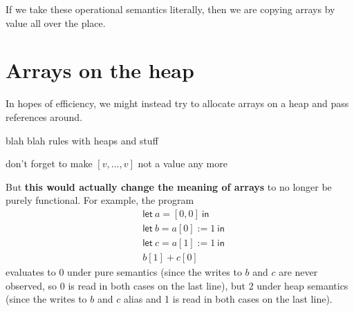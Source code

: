 \documentclass{article}
\newcommand{\todo}[1]{{\color{red} #1}}
\newcommand{\kw}[1]{\ensuremath{\mathsf{#1}}}
\newcommand{\letin}[2]{\kw{let}\ #1 = #2\ \kw{in}}
\newcommand{\step}[2]{\ensuremath{#1~\longrightarrow~#2}}
\begin{document}
{
\def\MathparLineskip {\lineskiplimit=1.2em\lineskip=2.5em plus 0.2em}

{
\setlength{\fboxsep}{5pt}
\fbox{\step{e}{e}}
}
}

If we take these operational semantics literally, then we are copying
arrays by value all over the place.

\clearpage

\section*{Arrays on the heap}
In hopes of efficiency, we might instead
try to allocate arrays on a heap and pass references around.

\vspace{1cm}
\todo{blah blah rules with heaps and stuff}

\todo{don't forget to make $[v, \dots, v]$ not a value any more}
\vspace{1cm}

But \textbf{this would actually change the meaning of arrays} to no longer be
purely functional. For example, the program
\begin{align*}
  &\letin{a}{[0, 0]}\\
  &\letin{b}{a[0] := 1}\\
  &\letin{c}{a[1] := 1}\\
  &b[1] + c[0]
\end{align*}
evaluates to 0 under pure semantics (since the writes to $b$ and $c$
are never observed, so 0 is read in both cases on the last line), but
2 under heap semantics (since the writes to $b$ and $c$ alias and 1 is
read in both cases on the last line).
\end{document}
